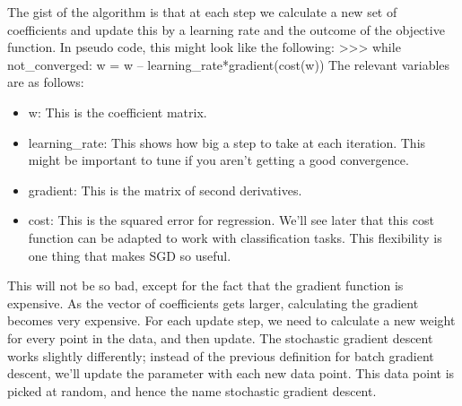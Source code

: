 The gist of the algorithm is that at each step we calculate a new set of coefficients and
update this by a learning rate and the outcome of the objective function.
In pseudo code, this might look like the following:
>>> while not_converged:
w = w – learning_rate*gradient(cost(w))
The relevant variables are as follows:
\begin{itemize}
\item w: This is the coefficient matrix.
\item learning_rate: This shows how big a step to take at each iteration. This might
be important to tune if you aren't getting a good convergence.
\item gradient: This is the matrix of second derivatives.
\item cost: This is the squared error for regression. We'll see later that this cost function
can be adapted to work with classification tasks. This flexibility is one thing that
makes SGD so useful.
\end{itemize}
This will not be so bad, except for the fact that the gradient function is expensive. As the
vector of coefficients gets larger, calculating the gradient becomes very expensive. For each
update step, we need to calculate a new weight for every point in the data, and then update.
The stochastic gradient descent works slightly differently; instead of the previous definition
for batch gradient descent, we'll update the parameter with each new data point. This data
point is picked at random, and hence the name stochastic gradient descent.
